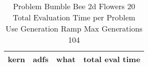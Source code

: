 \begin{table}[H]
\caption{Problem  Bumble Bee 2d  Flowers 20\\Total Evaluation Time per Problem \\ Use Generation Ramp  Max Generations 104\\}
\begin{center}
\scalebox{1.0} %
{
\begin{tabular}{lllr}
\hline
kern & adfs & what & total eval time \\
\hline


\end{tabular}
}
\end{center}
\end{table}

